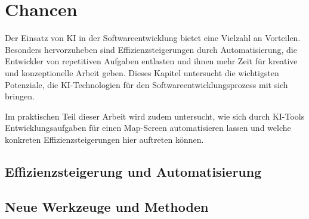 \chapter{Chancen}
Der Einsatz von KI in der Softwareentwicklung bietet eine Vielzahl an Vorteilen. Besonders hervorzuheben sind Effizienzsteigerungen durch Automatisierung, die Entwickler von repetitiven Aufgaben entlasten und ihnen mehr Zeit für kreative und konzeptionelle Arbeit geben. Dieses Kapitel untersucht die wichtigsten Potenziale, die KI-Technologien für den Softwareentwicklungsprozess mit sich bringen.

Im praktischen Teil dieser Arbeit wird zudem untersucht, wie sich durch KI-Tools Entwicklungsaufgaben für einen Map-Screen automatisieren lassen und welche konkreten Effizienzsteigerungen hier auftreten können.
\section{Effizienzsteigerung und Automatisierung}


\section{Neue Werkzeuge und Methoden}



